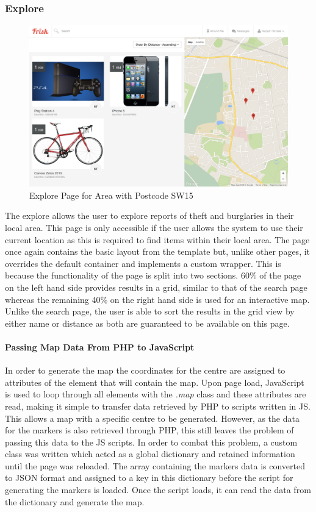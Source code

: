 \subsubsection{Explore}
\begin{figure}[H]
	\centering
	\includegraphics[width=1.0\textwidth]{images/Frisk/Around_SW15}
	\caption{Explore Page for Area with Postcode SW15} \label{fig:Around_SW15}
\end{figure}

The explore allows the user to explore reports of theft and burglaries in their local area. This page is only accessible if the user allows the system to use their current location as this is required to find items within their local area. The page once again contains the basic layout from the template but, unlike other pages, it overrides the default container and implements a custom wrapper. This is because the functionality of the page is split into two sections. 60\% of the page on the left hand side provides results in a grid, similar to that of the search page whereas the remaining 40\% on the right hand side is used for an interactive map. Unlike the search page, the user is able to sort the results in the grid view by either name or distance as both are guaranteed to be available on this page.

\paragraph{Passing Map Data From PHP to JavaScript}

In order to generate the map the coordinates for the centre are assigned to attributes of the element that will contain the map. Upon page load, JavaScript is used to loop through all elements with the \emph{.map} class and these attributes are read, making it simple to transfer data retrieved by PHP to scripts written in JS. This allows a map with a specific centre to be generated. However, as the data for the markers is also retrieved through PHP, this still leaves the problem of passing this data to the JS scripts. In order to combat this problem, a custom class was written which acted as a global dictionary and retained information until the page was reloaded. The array containing the markers data is converted to JSON format and assigned to a key in this dictionary before the script for generating the markers is loaded. Once the script loads, it can read the data from the dictionary and generate the map.

